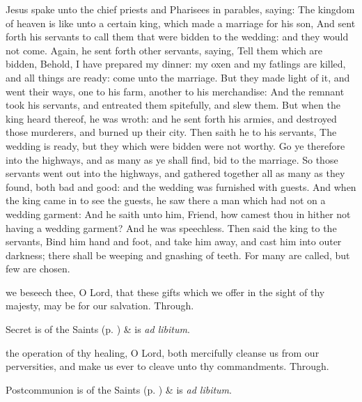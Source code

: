  Jesus spake unto the chief priests and Pharisees in parables, saying: The kingdom of heaven is like unto a certain king, which made a marriage for his son, And sent forth his servants to call them that were bidden to the wedding: and they would not come. Again, he sent forth other servants, saying, Tell them which are bidden, Behold, I have prepared my dinner: my oxen and my fatlings are killed, and all things are ready: come unto the marriage. But they made light of it, and went their ways, one to his farm, another to his merchandise: And the remnant took his servants, and entreated them spitefully, and slew them. But when the king heard thereof, he was wroth: and he sent forth his armies, and destroyed those murderers, and burned up their city. Then saith he to his servants, The wedding is ready, but they which were bidden were not worthy. Go ye therefore into the highways, and as many as ye shall find, bid to the marriage. So those servants went out into the highways, and gathered together all as many as they found, both bad and good: and the wedding was furnished with guests. And when the king came in to see the guests, he saw there a man which had not on a wedding garment: And he saith unto him, Friend, how camest thou in hither not having a wedding garment? And he was speechless. Then said the king to the servants, Bind him hand and foot, and take him away, and cast him into outer darkness; there shall be weeping and gnashing of teeth. For many are called, but few are chosen.


\vspace{-0.5ex}

\secret
{} we beseech thee, O Lord, that these gifts which we offer in the sight of thy majesty, may be for our salvation. Through.

\vspace{0.25ex}

\begin{rubric}
     Secret is of the Saints (p. \pageref{SPSaints}) \&  is \emph{ad libitum}.
\end{rubric}

\vspace{-0.5ex}

\postcommunion
{} the operation of thy healing, O Lord, both mercifully cleanse us from our perversities, and make us ever to cleave unto thy commandments. Through.
\begin{rubric}
     Postcommunion is of the Saints (p. \pageref{SPSaints}) \&  is \emph{ad libitum}.
\end{rubric}

